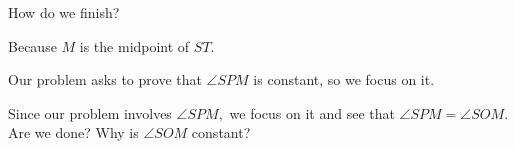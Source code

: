 How do we finish?


Because $M$ is the midpoint of $ST$.







Our problem asks to prove that $\angle SPM$ is constant, so we focus on it.

Since our problem involves $\angle SPM,$ we focus on it and see that $\angle SPM =\angle SOM.$  Are we done? Why is $\angle SOM$ constant?








